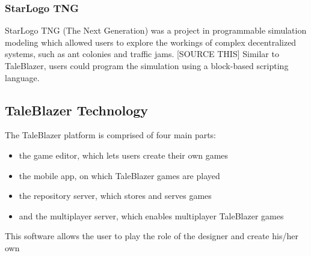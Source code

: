 \subsubsection{StarLogo TNG}

StarLogo TNG (The Next Generation) was a project in programmable simulation modeling which allowed users to explore the workings of complex decentralized systems, such as ant colonies and traffic jams. [SOURCE THIS] Similar to TaleBlazer, users could program the simulation using a block-based scripting language. 

\subsection{TaleBlazer Technology}

The TaleBlazer platform is comprised of four main parts:
	\begin{itemize}
 		\item the game editor, which lets users create their own games
 		\item the mobile app, on which TaleBlazer games are played
 		\item the repository server, which stores and serves games
 		\item and the multiplayer server, which enables multiplayer TaleBlazer games
 	\end{itemize}

This software allows the user to play the role of the designer and create his/her own








